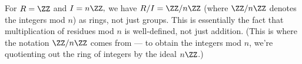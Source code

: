 
\begin{example}
For $R = \ZZ$ and $I = n\ZZ,$ we have $R/I = \ZZ/n\ZZ$ (where $\ZZ/n\ZZ$ denotes the integers mod $n$) as rings, not just groups. This is essentially the fact that multiplication of residues mod $n$ is well-defined, not just addition. (This is where the notation $\ZZ/n\ZZ$ comes from --- to obtain the integers mod $n$, we're quotienting out the ring of integers by the ideal $n\ZZ$.) 
\end{example}